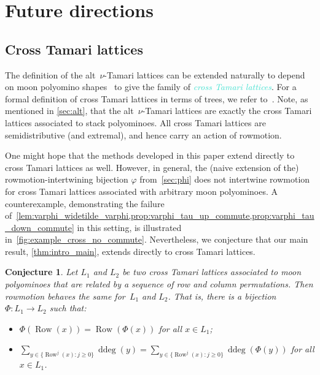 \documentclass[11pt]{amsart}
\DeclareMathOperator{\row}{Row}
\DeclareMathOperator{\ddeg}{ddeg}
\newcommand{\dfn}[1]{\textcolor{Turquoise}{\emph{#1}}}
\newtheorem{conjecture}[theorem]{Conjecture}
\theoremstyle{definition}
\begin{document}
\section{Future directions} \label{sec:future}

\subsection{Cross Tamari lattices} \label{sec:cross}

The definition of the alt~$\nu$-Tamari lattices can be extended naturally to depend on moon polyomino shapes~\cite{jonsson2005generalized,rubey2012maximal} to give the family of \dfn{cross Tamari lattices}. For a formal definition of cross Tamari lattices in terms of trees, we refer to~\cite[Section 2.4]{vonbell2025framing}. Note, as mentioned in \cref{sec:alt}, that the alt~$\nu$-Tamari lattices are exactly the cross Tamari lattices associated to stack polyominoes. All cross Tamari lattices are semidistributive (and extremal), and hence carry an action of rowmotion.

One might hope that the methods developed in this paper extend directly to cross Tamari lattices as well. However, in general, the (naive extension of the) rowmotion-intertwining bijection $\varphi$ from~\cref{sec:phi} does not intertwine rowmotion for cross Tamari lattices associated with arbitrary moon polyominoes. A counterexample, demonstrating the failure of~\cref{lem:varphi_widetilde_varphi,prop:varphi_tau_up_commute,prop:varphi_tau_down_commute} in this setting, is illustrated in~\cref{fig:example_cross_no_commute}. Nevertheless, we conjecture that our main result, \cref{thm:intro_main}, extends directly to cross Tamari lattices.

\begin{conjecture} \label{conj:cross_tamari}
Let $L_1$ and $L_2$ be two cross Tamari lattices associated to moon polyominoes that are related by a sequence of row and column permutations. Then rowmotion behaves the same for~$L_1$ and $L_2$. That is, there is a bijection $\Phi\colon L_1 \to L_2$ such that:
\begin{itemize}
\item $\Phi( \row (x) ) = \row (\Phi (x))$ for all $x \in L_1$;
\item $\sum_{y \in \{\row^j(x)\colon j\geq 0\}} \ddeg(y) = \sum_{y \in \{\row^j(x)\colon j\geq 0\}} \ddeg(\Phi(y))$ for all $x \in L_1$.
\end{itemize} 
\end{conjecture}
\end{document}
